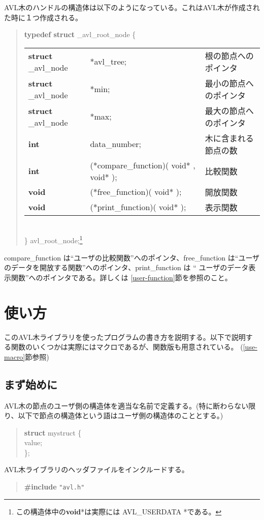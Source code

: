 AVL木のハンドルの構造体は以下のようになっている。これはAVL木が作成され
た時に１つ作成される。
\begin{quote}
\small
{\bf typedef struct} \_avl\_root\_node \{\\
\hspace*{1cm}
\begin{tabular}{lll}
{\bf struct} \_avl\_node	&*avl\_tree;	&根の節点へのポインタ\\
{\bf struct} \_avl\_node	&*min;		&最小の節点へのポインタ\\
{\bf struct} \_avl\_node	&*max;		&最大の節点へのポインタ\\
{\bf int}			&data\_number;	&木に含まれる節点の数\\
{\bf int}			&(*compare\_function)( void* , void* );	&比較関数\\
{\bf void}			&(*free\_function)( void* );		&開放関数\\
{\bf void}			&(*print\_function)( void* );		&表示関数\\
\end{tabular}\\
\} avl\_root\_node;\footnote{この構造体中の{\bf void}*は実際には
AVL\_USERDATA *である。}
\end{quote}
compare\_function は``ユーザの比較関数''へのポインタ、free\_function 
は``ユーザのデータを開放する関数''へのポインタ、print\_function は ``
ユーザのデータ表示関数''へのポインタである。詳しくは
\ref{user-function}節を参照のこと。

\section{使い方}
このAVL木ライブラリを使ったプログラムの書き方を説明する。以下で説明す
る関数のいくつかは実際にはマクロであるが、関数版も用意されている。
(\ref{use-macro}節参照)

\subsection{まず始めに}
AVL木の節点のユーザ側の構造体を適当な名前で定義する。(特に断わらない限
り、以下で節点の構造体という語はユーザ側の構造体のこととする。)
\begin{quote}
{\bf struct} mystruct \{\\
\hspace*{1cm}{\bf int} value;\\
\};
\end{quote}

AVL木ライブラリのヘッダファイルをインクルードする。
\begin{quote}
{\bf\#include} \verb+"avl.h"+
\end{quote}

